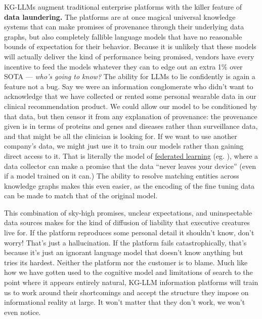 KG-LLMs augment traditional enterprise platforms with the killer feature
of \textbf{data laundering.} The platforms are at once magical universal
knowledge systems that can make promises of provenance through their
underlying data graphs, but also completely fallible language models
that have no reasonable bounds of expectation for their behavior.
Because it is unlikely that these models will actually deliver the kind
of performance being promised, vendors have every incentive to feed the
models whatever they can to edge out an extra 1\% over SOTA --- \emph{who's going to know?} The
ability for LLMs to lie confidently is again a feature not a bug. Say we
were an information conglomerate who didn't want to acknowledge that we
have collected or rented some personal wearable data in our clinical
recommendation product. We could allow our model to be conditioned by that data, but
then censor it from any explanation of provenance: the provenance given
is in terms of proteins and genes and diseases rather than surveillance
data, and that might be all the clinician is looking for. If we want to
use another company's data, we might just use it to train our models
rather than gaining direct access to it. That is literally the model of
\href{https://en.wikipedia.org/wiki/Federated_learning}{federated
learning} (eg. \cite{sadilekPrivacyfirstHealthResearch2021, mcmahanTrainingUserlevelDifferentially2022} ), where a data collector
can make a promise that the data ``never leaves your device'' (even if a
model trained on it can.) The ability to resolve matching entities
across knowledge graphs makes this even easier, as the encoding of the
fine tuning data can be made to match that of the original model.

This combination of sky-high promises, unclear expectations, and
uninspectable data sources makes for the kind of diffusion of liability
that executive creatures live for. If the platform reproduces some
personal detail it shouldn't know, don't worry! That's just a
hallucination. If the platform fails catastrophically, that's because
it's just an ignorant language model that doesn't know anything but
tries its hardest. Neither the platform nor the
customer is to blame. Much like how we have gotten used to the cognitive
model and limitations of search to the point where it appears entirely
natural, KG-LLM information platforms will train us to work around their
shortcomings and accept the structure they impose on informational
reality at large. It won't matter that they don't work, we won't even
notice.

